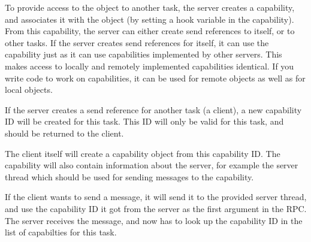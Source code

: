To provide access to the object to another task, the server creates a
capability, and associates it with the object (by setting a hook
variable in the capability).  From this capability, the server can
either create send references to itself, or to other tasks.  If the
server creates send references for itself, it can use the capability
just as it can use capabilities implemented by other servers.  This
makes access to locally and remotely implemented capabilities
identical.  If you write code to work on capabilities, it can be used
for remote objects as well as for local objects.

If the server creates a send reference for another task (a client), a
new capability ID will be created for this task.  This ID will only be
valid for this task, and should be returned to the client.

The client itself will create a capability object from this capability
ID.  The capability will also contain information about the server,
for example the server thread which should be used for sending
messages to the capability.

If the client wants to send a message, it will send it to the provided
server thread, and use the capability ID it got from the server as the
first argument in the RPC.  The server receives the message, and now
has to look up the capability ID in the list of capabilties for this
task.

\begin{comment}
  The server knows the task ID from the version field of the sender's
  thread ID.  It can look up the list of capabilities for this task in
  a hash table.  The capability ID can be an index into an array, so
  the server only needs to perform a range check.  This allows to
  verify quickly that the user is allowed to access the object.
  
  This is not enough if several systems run in parallel on the same
  host.  Then the version ID for the threads in the other systems will
  not be under the control of the Hurd's \texttt{task} server, and can
  thus not be trusted.  The server can still use the version field to
  find out the task ID, which will be correct \emph{if the thread is
    part of the same subsystem}.  It also has to verify that the
  thread belongs to this subsystem.  Hopefully the subsystem will be
  encoded in the thread ID.  Otherwise, the \texttt{task} server has
  to be consulted (and, assuming that thread numbers are not shared by
  the different systems, the result can be cached).
\end{comment}

